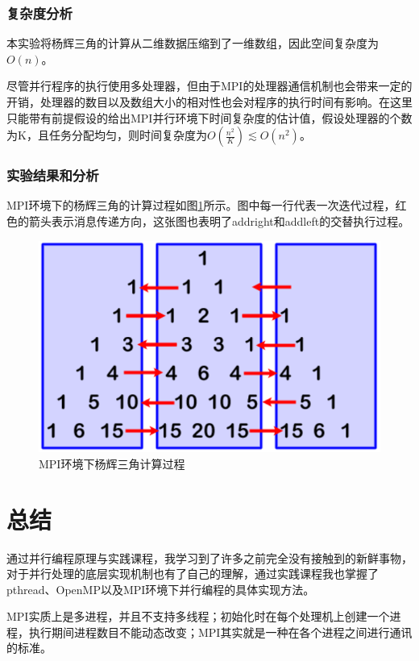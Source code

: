 \documentclass[supercite]{Experimental_Report}
\theoremstyle{definition}
\begin{document}
\subsubsection{复杂度分析}
本实验将杨辉三角的计算从二维数据压缩到了一维数组，因此空间复杂度为$O(n)$。

尽管并行程序的执行使用多处理器，但由于MPI的处理器通信机制也会带来一定的开销，处理器的数目以及数组大小的相对性也会对程序的执行时间有影响。在这里只能带有前提假设的给出MPI并行环境下时间复杂度的估计值，假设处理器的个数为K，且任务分配均匀，则时间复杂度为$O(\frac{n^2}{K})\lesssim O(n^2)$。

\subsubsection{实验结果和分析}
MPI环境下的杨辉三角的计算过程如图\ref{fig:p5}所示。图中每一行代表一次迭代过程，红色的箭头表示消息传递方向，这张图也表明了addright和addleft的交替执行过程。
\begin{figure}[ht]
\centering
\includegraphics[scale=0.7]{杨辉三角02.png}
\caption{MPI环境下杨辉三角计算过程}
\label{fig:p5}
\end{figure}

\newpage
\section{总结}
通过并行编程原理与实践课程，我学习到了许多之前完全没有接触到的新鲜事物，对于并行处理的底层实现机制也有了自己的理解，通过实践课程我也掌握了pthread、OpenMP以及MPI环境下并行编程的具体实现方法。

MPI实质上是多进程，并且不支持多线程；初始化时在每个处理机上创建一个进程，执行期间进程数目不能动态改变；MPI其实就是一种在各个进程之间进行通讯的标准。
\end{document}
